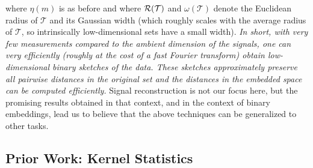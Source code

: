 where $\eta(m)$ is as before and \fi
where $\mathcal{R}(\mathcal{T})$ and $\omega(\mathcal{T})$ denote  the Euclidean radius of  $\mathcal{T}$ and its Gaussian width (which roughly scales with the average radius of $\mathcal{T}$, so  intrinsically low-dimensional sets have a small  width). 
\fi
 \emph{In short, with \emph{very few measurements} compared to the ambient dimension of the signals, one can very efficiently (roughly at the cost of a fast Fourier transform) obtain low-dimensional binary sketches of the data. These sketches approximately preserve all pairwise distances in the original set and the distances in the embedded space can be computed efficiently.}
Signal reconstruction is not our focus here, but the promising results obtained in that context, and in the context of binary embeddings, lead us to believe that the above techniques can be generalized to other tasks. 





\subsection{Prior Work: Kernel Statistics}\label{sec:KernelBackground}

